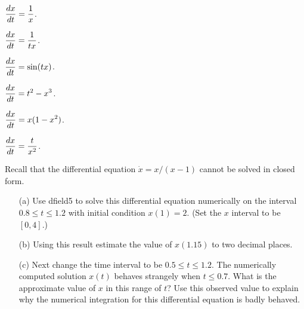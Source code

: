\documentclass{ximera}
\begin{document}
\begin{exercise} \label{c14.1.11a}
$\displaystyle\frac{dx}{dt} = \frac{1}{x}$.
\end{exercise}
\begin{exercise} \label{c14.1.11b}
$\displaystyle\frac{dx}{dt} = \frac{1}{tx}$.
\end{exercise}
\begin{exercise} \label{c14.1.11c}
$\displaystyle\frac{dx}{dt} = \sin(tx)$.
\end{exercise}
\begin{exercise} \label{c14.1.11d}
$\displaystyle\frac{dx}{dt} = t^2 - x^3$.
\end{exercise}
\begin{exercise} \label{c14.1.11e}
$\displaystyle\frac{dx}{dt} = x(1-x^2)$.
\end{exercise}
\begin{exercise} \label{c14.1.11f}
$\displaystyle\frac{dx}{dt} = \frac{t}{x^2}$.
\end{exercise}

\begin{exercise} \label{c14.1.17}
Recall that the differential equation  $\dot{x}=x/(x-1)$ cannot be 
solved in closed form.  
\begin{itemize}
\item[(a)]	Use {\sf dfield5} 
to solve this differential 
equation numerically on the interval $0.8\leq t\leq 1.2$ with initial 
condition $x(1)=2$.  (Set the $x$ interval to be $[0,4]$.)  
\item[(b)]	Using this result estimate the value of $x(1.15)$ to two 
decimal places.
\item[(c)]	Next change the time interval to be $0.5\leq t\leq 1.2$.
The numerically computed solution $x(t)$ behaves strangely when $t\leq 0.7$. 
What is the approximate value of $x$ in this range of $t$?  Use this 
observed value to explain why the numerical integration for this differential 
equation is badly behaved.
\end{itemize}
\end{exercise}
\end{document}
